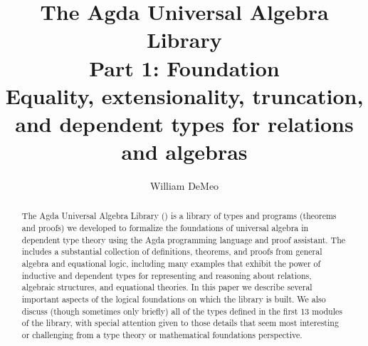 \documentclass[a4paper,UKenglish,cleveref,autoref,thm-restate,12pt]{../lipics-v2021-wjd}
\title{The Agda Universal Algebra Library\\%
Part 1: Foundation\\[-5pt]
{\large Equality, extensionality, truncation, and dependent types for relations and algebras} }%
\author{William DeMeo}
       {Department of Algebra, Charles University in Prague \and \url{https://williamdemeo.gitlab.io}}
       {williamdemeo@gmail.com}{https://orcid.org/0000-0003-1832-5690}{}
\begin{document}
\maketitle


\begin{abstract}
The Agda Universal Algebra Library (\ualib) is a library of types and programs (theorems and proofs) we developed to formalize the foundations of universal algebra in dependent type theory using the Agda programming language and proof assistant. The \ualib includes a substantial collection of definitions, theorems, and proofs from general algebra and equational logic, including many examples that exhibit the power of inductive and dependent types for representing and reasoning about relations, algebraic structures, and equational theories. In this paper we describe several important aspects of the logical foundations on which the library is built. We also discuss (though sometimes only briefly) all of the types defined in the first 13 modules of the library, with special attention given to those details that seem most interesting or challenging from a type theory or mathematical foundations perspective.
\end{abstract}



\newpage %

\setcounter{tocdepth}{2}
\tableofcontents



% 
% 
% 
% 
% 

















% 








\end{document}
